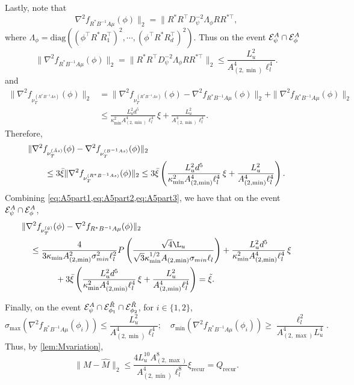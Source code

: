 Lastly, note that 
$$\nabla^2f_{R^*B^{-1}A \mu}(\phi)\|_2 = \|R^*R^{\top}D^{-2}_{\psi}\Lambda_{\phi}RR^{*\top},$$ 
where $\Lambda_{\phi} = \text{diag}\left((\phi^{\top}R^*R_1^{\top})^2, \cdots, (\phi^{\top}R^*R_d^{\top})^2 \right)$.
Thus on the event $\mathcal{E}^A_{\psi}\cap\mathcal{E}^A_{\phi}$
\[
\|\nabla^2f_{R^*B^{-1}A \mu}(\phi)\|_2 = \|R^*R^{\top}D^{-2}_{\psi}\Lambda_{\phi}RR^{*\top} \|_2
\le \frac{L_u^2}{A^4_{(2,\min)}\ell_l^4}.
\]
and
\begin{align*}
\|\nabla^2f_{\nu_T^{(R^*B^{-1}A s)}}(\phi)\|_2 
&= \|\nabla^2f_{\nu_T^{(R^*B^{-1}A s)}}(\phi) - \nabla^2f_{R^*B^{-1}A \mu}(\phi)\|_2 + \|\nabla^2f_{R^*B^{-1}A \mu}(\phi)\|_2 \\
& \le \frac{L_u^2d^5}{\kappa^{2}_{\min}A^4_{(2,\min)}\ell^4_l}\,\xi + \frac{L_u^2}{A^4_{(2,\min)}\ell_l^4}.
\end{align*}
Therefore,
\begin{align}
& \|\nabla^2f_{\nu_T^{(\tilde{A} s)}}(\phi) - \nabla^2f_{\nu_T^{(B^{-1}A s)}}(\phi)\|_2 \nonumber\\
&\qquad \le 3\bar{\xi}\|\nabla^2f_{\nu_T^{(R^*B^{-1}A s)}}(\phi)\|_2\le 3\bar{\xi}\left(\frac{L_u^2d^5}{\kappa^{2}_{\min}A^4_{(2,\min)}\ell^4_l}\,\xi + \frac{L_u^2}{A^4_{(2,\min)}\ell_l^4} \right). \label{eq:A5part3}
\end{align}
Combining \cref{eq:A5part1,eq:A5part2,eq:A5part3}, we have that on the event $\mathcal{E}^A_{\psi}\cap\mathcal{E}^A_{\phi}$,
\begin{align*}
& \| \nabla^2f_{\nu_T^{(\hat{y})}}(\phi) - \nabla^2f_{R^*B^{-1}A \mu}(\phi) \|_2  \\
& \quad \le \frac{4}{3\kappa_{\min}A^2_{(2,\min)}\sigma^2_{min}\ell^2_l}P\left(\frac{\sqrt{4}\L_u}{\sqrt{3}\kappa_{\min}^{1/2}A_{(2,\min)}\sigma_{min}\ell_l}\right) + \frac{L_u^2d^5}{\kappa^{2}_{\min}A^4_{(2,\min)}\ell^4_l}\,\xi \\
& \qquad \qquad + 3\bar{\xi}\left(\frac{L_u^2d^5}{\kappa^{2}_{\min}A^4_{(2,\min)}\ell^4_l}\,\xi + \frac{L_u^2}{A^4_{(2,\min)}\ell_l^4} \right)  = \tilde{\xi}.
\end{align*}

Finally, on the event $\mathcal{E}^A_{\psi}\cap\mathcal{E}^{\tilde{R}}_{\phi_1}\cap\mathcal{E}^{\tilde{R}}_{\phi_2}$, for $i\in \{1,2\}$,
\[
\sigma_{\max}\left(\nabla^2f_{R^*B^{-1}A \mu}(\phi_i)\right) \le \frac{L_u^2}{A^4_{(2,\min)}\ell_l^4}; \quad \sigma_{\min}\left(\nabla^2f_{R^*B^{-1}A \mu}(\phi_i)\right) \ge \frac{\ell_l^2}{A^4_{(2,\max)}L_u^4}.
\]
Thus, by \cref{lem:Mvariation},
\begin{equation*}
\|M-\hat{M}\|_2 \le \frac{4L_u^{10}A^8_{(2,\max)}}{A^4_{(2,\min)}\ell_l^8}\xi_{\text{recur}} = Q_{\text{recur}}.
\end{equation*}


